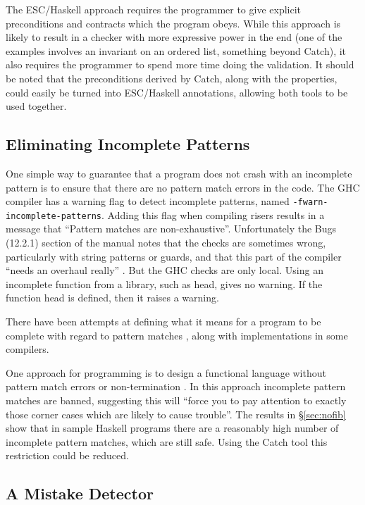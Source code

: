 \documentclass[preprint]{sigplanconf}
\newcommand{\T}[1]{\texttt{#1}}
\newcommand{\C}[1]{\textsf{#1}}
\begin{document}
The ESC/Haskell approach requires the programmer to give explicit preconditions and contracts which the program obeys. While this approach is likely to result in a checker with more expressive power in the end (one of the examples involves an invariant on an ordered list, something beyond Catch), it also requires the programmer to spend more time doing the validation. It should be noted that the preconditions derived by Catch, along with the properties, could easily be turned into ESC/Haskell annotations, allowing both tools to be used together.

\subsection{Eliminating Incomplete Patterns}

One simple way to guarantee that a program does not crash with an incomplete pattern is to ensure that there are no pattern match errors in the code. The GHC \citep{ghc_manual} compiler has a warning flag to detect incomplete patterns, named \T{-fwarn-incomplete-patterns}. Adding this flag when compiling risers results in a message that ``Pattern matches are non-exhaustive''. Unfortunately the Bugs (12.2.1) section of the manual notes that the checks are sometimes wrong, particularly with string patterns or guards, and that this part of the compiler ``needs an overhaul really'' \citep{ghc_manual}. But the GHC checks are only local. Using an incomplete function from a library, such as \C{head}, gives no warning. If the function \C{head} is defined, then it raises a warning.

There have been attempts at defining what it means for a program to be complete with regard to pattern matches \citep{pattern_match}, along with implementations in some compilers.

One approach for programming is to design a functional language without pattern match errors or non-termination \cite{tfp:total}. In this approach incomplete pattern matches are banned, suggesting this will ``force you to pay attention to exactly those corner cases which are likely to cause trouble''. The results in \S\ref{sec:nofib} show that in sample Haskell programs there are a reasonably high number of incomplete pattern matches, which are still safe. Using the Catch tool this restriction could be reduced.

\subsection{A Mistake Detector}
\end{document}
